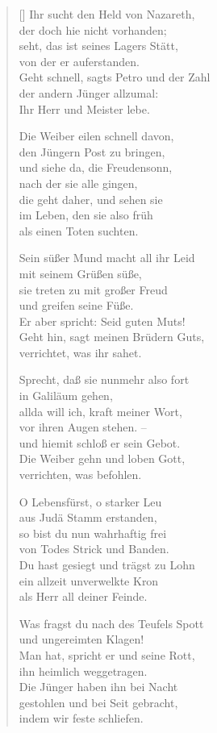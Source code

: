 \begin{multicols}{2}
\begin{verse}[\versewidth]
 Ihr sucht den Held von Nazareth,\\
der doch hie nicht vorhanden;\\
seht, das ist seines Lagers Stätt,\\
von der er auferstanden.\\
Geht schnell, sagts Petro und der Zahl\\
der andern Jünger allzumal:\\
Ihr Herr und Meister lebe.

 Die Weiber eilen schnell davon,\\
den Jüngern Post zu bringen,\\
und siehe da, die Freudensonn,\\
nach der sie alle gingen,\\
die geht daher, und sehen sie\\
im Leben, den sie also früh\\
als einen Toten suchten.

 Sein süßer Mund macht all ihr Leid\\
mit seinem Grüßen süße,\\
sie treten zu mit großer Freud\\
und greifen seine Füße.\\
Er aber spricht: Seid guten Muts!\\
Geht hin, sagt meinen Brüdern Guts,\\
verrichtet, was ihr sahet.

 Sprecht, daß sie nunmehr also fort\\
in Galiläum gehen,\\
allda will ich, kraft meiner Wort,\\
vor ihren Augen stehen. –\\
und hiemit schloß er sein Gebot.\\
Die Weiber gehn und loben Gott,\\
verrichten, was befohlen.

 O Lebensfürst, o starker Leu\\
aus Judä Stamm erstanden,\\
so bist du nun wahrhaftig frei\\
von Todes Strick und Banden.\\
Du hast gesiegt und trägst zu Lohn\\
ein allzeit unverwelkte Kron\\
als Herr all deiner Feinde.

 Was fragst du nach des Teufels Spott\\
und ungereimten Klagen!\\
Man hat, spricht er und seine Rott,\\
ihn heimlich weggetragen.\\
Die Jünger haben ihn bei Nacht\\
gestohlen und bei Seit gebracht,\\
indem wir feste schliefen.


\end{verse}
\end{multicols}
